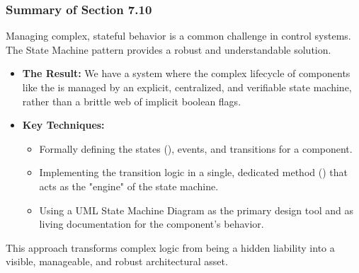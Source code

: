 \subsubsection{Summary of Section 7.10}
\label{subsubsec:section7_10_summary}
Managing complex, stateful behavior is a common challenge in control systems. The State Machine pattern provides a robust and understandable solution.
\begin{itemize}
    \item \textbf{The Result:} We have a system where the complex lifecycle of components like the  is managed by an explicit, centralized, and verifiable state machine, rather than a brittle web of implicit boolean flags.
    \item \textbf{Key Techniques:}
    \begin{itemize}
        \item Formally defining the states (), events, and transitions for a component.
        \item Implementing the transition logic in a single, dedicated method () that acts as the "engine" of the state machine.
        \item Using a UML State Machine Diagram as the primary design tool and as living documentation for the component's behavior.
    \end{itemize}
\end{itemize}
This approach transforms complex logic from being a hidden liability into a visible, manageable, and robust architectural asset.


